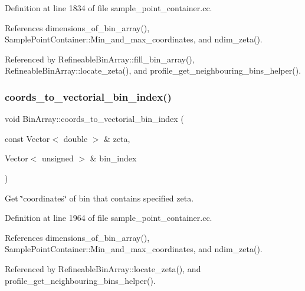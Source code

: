 Definition at line 1834 of file sample\+\_\+point\+\_\+container.\+cc.



References dimensions\+\_\+of\+\_\+bin\+\_\+array(), Sample\+Point\+Container\+::\+Min\+\_\+and\+\_\+max\+\_\+coordinates, and ndim\+\_\+zeta().



Referenced by Refineable\+Bin\+Array\+::fill\+\_\+bin\+\_\+array(), Refineable\+Bin\+Array\+::locate\+\_\+zeta(), and profile\+\_\+get\+\_\+neighbouring\+\_\+bins\+\_\+helper().

\mbox{\label{classBinArray_afc41ba4569c25acdf56000a6a82e7859}} 
\subsubsection{\texorpdfstring{coords\+\_\+to\+\_\+vectorial\+\_\+bin\+\_\+index()}{coords\_to\_vectorial\_bin\_index()}}
{\footnotesize\ttfamily void Bin\+Array\+::coords\+\_\+to\+\_\+vectorial\+\_\+bin\+\_\+index (\begin{DoxyParamCaption}\item[{const Vector$<$ double $>$ \&}]{zeta,  }\item[{Vector$<$ unsigned $>$ \&}]{bin\+\_\+index }\end{DoxyParamCaption})}



Get \char`\"{}coordinates\char`\"{} of bin that contains specified zeta. 



Definition at line 1964 of file sample\+\_\+point\+\_\+container.\+cc.



References dimensions\+\_\+of\+\_\+bin\+\_\+array(), Sample\+Point\+Container\+::\+Min\+\_\+and\+\_\+max\+\_\+coordinates, and ndim\+\_\+zeta().



Referenced by Refineable\+Bin\+Array\+::locate\+\_\+zeta(), and profile\+\_\+get\+\_\+neighbouring\+\_\+bins\+\_\+helper().

\mbox{\label{classBinArray_a0148631c80ef91ad21b985986ae24394}} 
